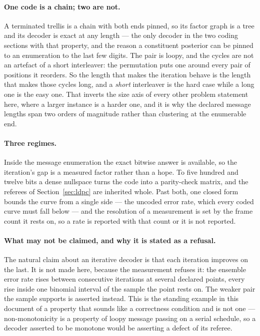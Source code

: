 \documentclass[11pt,a4paper]{article}
\begin{document}
\paragraph{One code is a chain; two are not.}
A terminated trellis is a chain with both ends pinned, so its factor graph
is a tree and its decoder is exact at any length --- the only decoder in the
two coding sections with that property, and the reason a constituent
posterior can be pinned to an enumeration to the last few digits. The pair
is loopy, and the cycles are not an artefact of a short interleaver: the
permutation puts one around every pair of positions it reorders. So the
length that makes the iteration behave is the length that makes those cycles
long, and a \emph{short} interleaver is the hard case while a long one is
the easy one. That inverts the size axis of every other problem statement
here, where a larger instance is a harder one, and it is why the declared
message lengths span two orders of magnitude rather than clustering at the
enumerable end.

\paragraph{Three regimes.}
Inside the message enumeration the exact bitwise answer is available, so the
iteration's gap is a measured factor rather than a hope. To five hundred and
twelve bits a dense nullspace turns the code into a parity-check matrix, and
the referees of Section~\ref{sec:ldpc} are inherited whole. Past both, one
closed form bounds the curve from a single side --- the uncoded error rate,
which every coded curve must fall below --- and the resolution of a
measurement is set by the frame count it rests on, so a rate is reported
with that count or it is not reported.

\paragraph{What may not be claimed, and why it is stated as a refusal.}
The natural claim about an iterative decoder is that each iteration improves
on the last. It is not made here, because the measurement refuses it: the
ensemble error rate rises between consecutive iterations at several declared
points, every rise inside one binomial interval of the sample the point
rests on. The weaker pair the sample supports is asserted instead. This is
the standing example in this document of a property that sounds like a
correctness condition and is not one --- non-monotonicity is a property of
loopy message passing on a serial schedule, so a decoder asserted to be
monotone would be asserting a defect of its referee.
\end{document}
